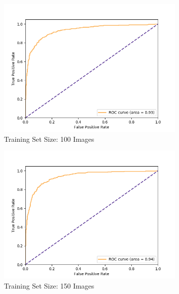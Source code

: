 \begin{figure}[ht]
\begin{subfigure}{.49\textwidth}
        \includegraphics[width=\textwidth]{images/score-50-roc.png}
        \caption{Training Set Size: 100 Images}
    \end{subfigure}
    \begin{subfigure}{.49\textwidth}
        \includegraphics[width=\textwidth]{images/score-75-roc.png}
        \caption{Training Set Size: 150 Images}
    \end{subfigure}
    \begin{subfigure}{.49\textwidth}

\end{subfigure}
\end{figure}

